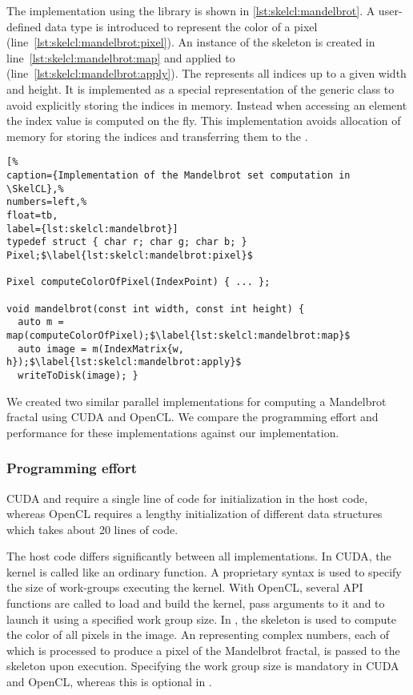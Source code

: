 The implementation using the \SkelCL library is shown in \autoref{lst:skelcl:mandelbrot}.
A user-defined data type is introduced to represent the color of a pixel (line~\ref{lst:skelcl:mandelbrot:pixel}).
An instance of the \map skeleton is created in line~\ref{lst:skelcl:mandelbrot:map} and applied to  (line~\ref{lst:skelcl:mandelbrot:apply}).
The  represents all indices up to a given width and height.
It is implemented as a special representation of the generic  class to avoid explicitly storing the indices in memory.
Instead when accessing an element the index value is computed on the fly.
This implementation avoids allocation of memory for storing the indices and transferring them to the \GPU.


\begin{lstlisting}[%                                                             
caption={Implementation of the Mandelbrot set computation in \SkelCL},%
numbers=left,%
float=tb,
label={lst:skelcl:mandelbrot}]
typedef struct { char r; char g; char b; } Pixel;$\label{lst:skelcl:mandelbrot:pixel}$

Pixel computeColorOfPixel(IndexPoint) { ... };

void mandelbrot(const int width, const int height) {
  auto m = map(computeColorOfPixel);$\label{lst:skelcl:mandelbrot:map}$
  auto image = m(IndexMatrix{w, h});$\label{lst:skelcl:mandelbrot:apply}$
  writeToDisk(image); }
\end{lstlisting}

We created two similar parallel implementations for computing a Mandelbrot fractal using CUDA and OpenCL.
We compare the programming effort and performance for these implementations against our \SkelCL implementation.

\subsubsection*{Programming effort}
\label{sec:mandelbrot:programming}

CUDA and \SkelCL require a single line of code for initialization in the host code, whereas OpenCL requires a lengthy initialization of different data structures which takes about 20 lines of code.

The host code differs significantly between all implementations.
In CUDA, the kernel is called like an ordinary function.
A proprietary syntax is used to specify the size of work-groups executing the kernel.
With OpenCL, several API functions are called to load and build the kernel, pass arguments to it and to launch it using a specified work group size.
In \SkelCL, the \map skeleton is used to compute the color of all pixels in the image.
An  representing complex numbers, each of which is processed to produce a pixel of the Mandelbrot fractal, is passed to the \map skeleton upon execution.
Specifying the work group size is mandatory in CUDA and OpenCL, whereas this is optional in \SkelCL.

